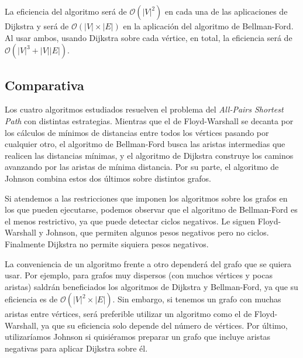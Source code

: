 \documentclass[a4paper, 11pt]{article} %
\begin{document}
	La eficiencia del algoritmo será de $\mathcal{O}(|V|^2)$ en cada una de las aplicaciones de
	Dijkstra y será de $\mathcal{O}(|V| \times |E|)$ en la aplicación del algoritmo de Bellman-Ford.
	Al usar ambos, usando Dijkstra sobre cada vértice, en total, la eficiencia será de 
	$\mathcal{O}(|V|^3+|V||E|)$.
	
    \subsection{Comparativa}
	Los cuatro algoritmos estudiados resuelven el problema del \textit{All-Pairs Shortest Path} con 
	distintas estrategias. Mientras que el de Floyd-Warshall se decanta por los cálculos de mínimos 
	de distancias entre todos los vértices pasando por cualquier otro, el algoritmo de Bellman-Ford 
	busca las aristas intermedias que realicen las distancias mínimas, y el algoritmo de Dijkstra 
	construye los caminos avanzando por las aristas de mínima distancia. Por su parte, el algoritmo 
	de Johnson combina estos dos últimos sobre distintos grafos.
	
	Si atendemos a las restricciones que imponen los algoritmos sobre los grafos en los que pueden 
	ejecutarse, podemos observar que el algoritmo de Bellman-Ford es el menos restrictivo, ya que 
	puede detectar ciclos negativos. Le siguen Floyd-Warshall y Johnson, que permiten algunos pesos 
	negativos pero no ciclos. Finalmente Dijkstra no permite siquiera pesos negativos.
	
	La conveniencia de un algoritmo frente a otro dependerá
	del grafo que se quiera usar. Por ejemplo, para grafos
	muy dispersos (con muchos vértices y pocas aristas)
	saldrán beneficiados los algoritmos de Dijkstra y
	Bellman-Ford, ya que su eficiencia es de
	$\mathcal{O}(|V|^2\times |E|)$. Sin embargo, si tenemos
	un grafo con muchas aristas entre vértices, será
	preferible utilizar un algoritmo como el de Floyd-Warshall,
	ya que su eficiencia solo depende del número de vértices.
	Por último, utilizaríamos Johnson si quisiéramos
	preparar un grafo que incluye aristas negativas
	para aplicar Dijkstra sobre él.
\end{document}

